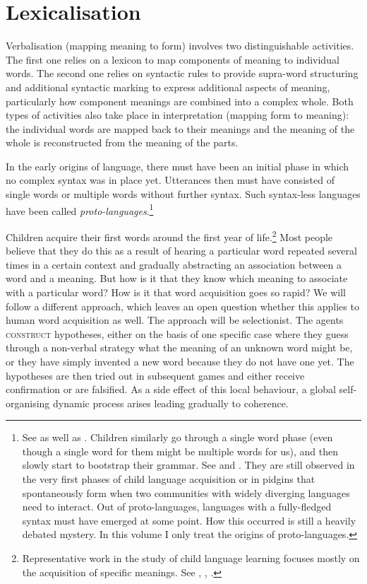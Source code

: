 \section{Lexicalisation}

Verbalisation (mapping meaning to form) 
involves two distinguishable activities.  The first one
relies on a lexicon to map components of meaning to
individual words. The second 
one relies on syntactic rules to provide supra-word structuring 
and additional syntactic marking to express additional
aspects of meaning, particularly how component meanings
are combined into a complex whole. Both types of 
activities also take place in interpretation (mapping form to meaning):
the individual words are mapped back to their meanings
and the meaning of the whole is reconstructed from the 
meaning of the parts. 

In the early origins of language,
there must have been an initial phase in which no complex syntax 
was in place yet. Utterances then must have consisted of single words
or multiple words without further syntax. 
Such syntax-less languages have been called {\itshape proto-languages}.\footnote{See \cite{Bickerton:1990} as well as \cite{Thomason:1988}. Children similarly 
go through a single word phase (even though a single 
word for them might be multiple words for us), and 
then slowly start to bootstrap their grammar. 
See  \cite{Tomasello:1991} and \cite{Bates:1991}. 
They are still observed in the very first phases of 
child language acquisition or in pidgins that spontaneously 
form when two communities with widely diverging languages
need to interact. Out of proto-languages, languages 
with a fully-fledged syntax must have emerged at some point. 
How this occurred is still a heavily debated mystery. In this volume 
I only treat the origins of proto-languages.} 

Children acquire their first words around the first year
of life.\footnote{Representative work in the study of child language
learning focuses mostly on the acquisition of specific meanings.
See  \cite{Gleitman:1994}, 
\cite{Clark:1993}, \cite{Bowerman:1996}.}
Most people believe that they do this 
as a result of hearing a particular word repeated several times in a
certain context and gradually abstracting an
association between a word and a meaning. But 
how is it that they know which meaning to associate with a 
particular word? How is it that word acquisition goes
so rapid? We will follow a different 
approach, which leaves an open question whether
this applies to human word acquisition as well. The
approach will be selectionist. The agents {\scshape construct} 
hypotheses, either on the basis of one specific case 
where they guess through a non-verbal strategy what 
the meaning of an unknown word might be, 
or they have simply invented a new word because
they do not have one yet. The hypotheses are 
then tried out in subsequent games and either receive confirmation
or are falsified. As a side effect of this local behaviour, 
a global self-organising dynamic process arises leading gradually to coherence. 

